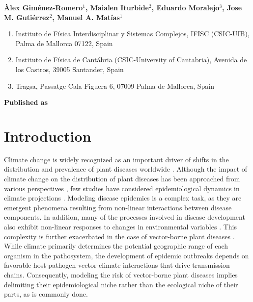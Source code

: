 \vspace{1cm}

\textbf{Àlex Giménez-Romero$^{1}$, Maialen Iturbide$^{2}$, Eduardo
    Moralejo$^{3}$, Jose M. Gutiérrez$^{2}$, Manuel A. Matías$^{1}$}

\vspace{1cm}

\begin{enumerate}
    \small
    \item Instituto de Física Interdisciplinar y Sistemas Complejos, IFISC
          (CSIC-UIB), Palma de Mallorca 07122, Spain
    \item Instituto de Física de Cantábria (CSIC-University of Cantabria),
          Avenida de los Castros, 39005 Santander, Spain
    \item Tragsa, Passatge Cala Figuera 6, 07009 Palma de Mallorca, Spain
\end{enumerate}

\vspace{1cm}

\textbf{Published as}

\vspace{0.5cm}


\newpage
\section{Introduction}

Climate change is widely recognized as an important driver of shifts in the
distribution and prevalence of plant diseases worldwide
\cite{harvell2002climate, Delgado-Baquerizo2020,  Rocklov2020, Dudney2021,
    Chaloner2021, Singh2023}. Although the impact of climate change on the
distribution of plant diseases has been approached from various perspectives
\cite{bergot2004simulation,pangga2011pathogen}, few studies have considered
epidemiological dynamics in climate projections
\cite{bebber2019climate,Juroszek2015}. Modeling disease epidemics is a complex
task, as they are emergent phenomena resulting from non-linear interactions
between disease components. In addition, many of the processes involved in
disease development also exhibit non-linear responses to changes in
environmental variables \cite{scherm1994global,garrett2011complexity}. This
complexity is further exacerbated in the case of vector-borne plant diseases
\cite{jeger2019epidemiology}. While climate primarily determines the potential
geographic range of each organism in the pathosystem, the development of
epidemic outbreaks depends on favorable host-pathogen-vector-climate
interactions that drive transmission chains. Consequently, modeling the risk of
vector-borne plant diseases implies delimiting their epidemiological niche
rather than the ecological niche of their parts, as is commonly done.

